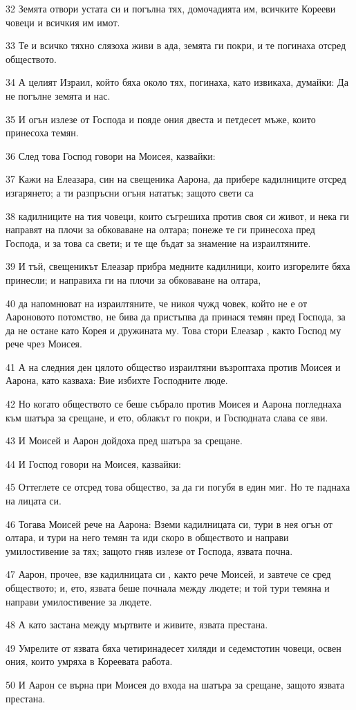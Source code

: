 \par 32 Земята отвори устата си и погълна тях, домочадията им, всичките Корееви човеци и всичкия им имот.
\par 33 Те и всичко тяхно слязоха живи в ада, земята ги покри, и те погинаха отсред обществото.
\par 34 А целият Израил, който бяха около тях, погинаха, като извикаха, думайки: Да не погълне земята и нас.
\par 35 И огън излезе от Господа и пояде ония двеста и петдесет мъже, които принесоха темян.
\par 36 След това Господ говори на Моисея, казвайки:
\par 37 Кажи на Елеазара, син на свещеника Аарона, да прибере кадилниците отсред изгарянето; а ти разпръсни огъня нататък; защото свети са
\par 38 кадилниците на тия човеци, които съгрешиха против своя си живот, и нека ги направят на плочи за обковаване на олтара; понеже те ги принесоха пред Господа, и за това са свети; и те ще бъдат за знамение на израилтяните.
\par 39 И тъй, свещеникът Елеазар прибра медните кадилници, които изгорелите бяха принесли; и направиха ги на плочи за обковаване на олтара,
\par 40 да напомнюват на израилтяните, че никоя чужд човек, който не е от Аароновото потомство, не бива да пристъпва да принася темян пред Господа, за да не остане като Корея и дружината му. Това стори Елеазар , както Господ му рече чрез Моисея.
\par 41 А на следния ден цялото общество израилтяни възроптаха против Моисея и Аарона, като казваха: Вие избихте Господните люде.
\par 42 Но когато обществото се беше събрало против Моисея и Аарона погледнаха към шатъра за срещане, и ето, облакът го покри, и Господната слава се яви.
\par 43 И Моисей и Аарон дойдоха пред шатъра за срещане.
\par 44 И Господ говори на Моисея, казвайки:
\par 45 Оттеглете се отсред това общество, за да ги погубя в един миг. Но те паднаха на лицата си.
\par 46 Тогава Моисей рече на Аарона: Вземи кадилницата си, тури в нея огън от олтара, и тури на него темян та иди скоро в обществото и направи умилостивение за тях; защото гняв излезе от Господа, язвата почна.
\par 47 Аарон, прочее, взе кадилницата си , както рече Моисей, и завтече се сред обществото; и, ето, язвата беше почнала между людете; и той тури темяна и направи умилостивение за людете.
\par 48 А като застана между мъртвите и живите, язвата престана.
\par 49 Умрелите от язвата бяха четиринадесет хиляди и седемстотин човеци, освен ония, които умряха в Кореевата работа.
\par 50 И Аарон се върна при Моисея до входа на шатъра за срещане, защото язвата престана.

